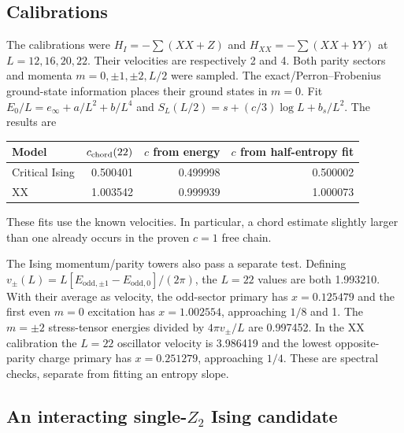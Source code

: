 \documentclass[11pt]{article}
\begin{document}
\subsection{Calibrations}

The calibrations were $H_I=-\sum(XX+Z)$ and
$H_{XX}=-\sum(XX+YY)$ at $L=12,16,20,22$. Their velocities are respectively
2 and 4. Both parity sectors and momenta $m=0,\pm1,\pm2,L/2$ were sampled.
The exact/Perron--Frobenius ground-state information places their ground
states in $m=0$. Fit $E_0/L=e_\infty+a/L^2+b/L^4$ and
$S_L(L/2)=s+(c/3)\log L+b_s/L^2$. The results are
\begin{center}
\begin{tabular}{lrrr}
\toprule
Model & $c_{\rm chord}(22)$ & $c$ from energy & $c$ from half-entropy fit\\
\midrule
Critical Ising & 0.500401 & 0.499998 & 0.500002\\
XX & 1.003542 & 0.999939 & 1.000073\\
\bottomrule
\end{tabular}
\end{center}
These fits use the known velocities. In particular, a chord estimate slightly
larger than one already occurs in the proven $c=1$ free chain.

The Ising momentum/parity towers also pass a separate test. Defining
$v_\pm(L)=L[E_{\mathrm{odd},\pm1}-E_{\mathrm{odd},0}]/(2\pi)$, the $L=22$
values are both 1.993210. With their average as velocity, the odd-sector
primary has $x=0.125479$ and the first even $m=0$ excitation has $x=1.002554$,
approaching $1/8$ and 1. The $m=\pm2$ stress-tensor energies divided by
$4\pi v_\pm/L$ are 0.997452. In the XX calibration the $L=22$ oscillator
velocity is 3.986419 and the lowest opposite-parity charge primary has
$x=0.251279$, approaching $1/4$. These are spectral checks, separate from
fitting an entropy slope.

\subsection{An interacting single-$Z_2$ Ising candidate}
\end{document}
